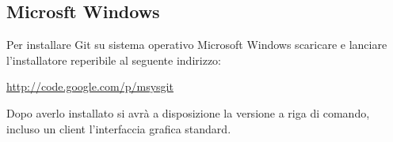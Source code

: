 \subsection{Microsft Windows}
Per installare Git su sistema operativo Microsoft Windows scaricare e lanciare l'installatore reperibile al seguente indirizzo:

\begin{center}
\url{http://code.google.com/p/msysgit}
\end{center}

Dopo averlo installato si avrà a disposizione la versione a riga di comando, incluso un client l'interfaccia grafica standard.